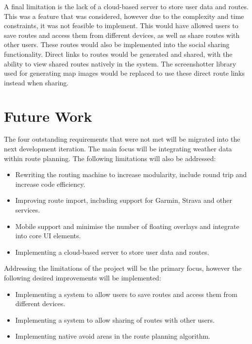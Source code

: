 A final limitation is the lack of a cloud-based server to store user data and routes. This was a feature that was considered, however due to the complexity and time constraints, it was not feasible to implement. This would have allowed users to save routes and access them from different devices, as well as share routes with other users. These routes would also be implemented into the social sharing functionality. Direct links to routes would be generated and shared, with the ability to view shared routes natively in the system. The screenshotter library used for generating map images would be replaced to use these direct route links instead when sharing.

\section{Future Work}
\label{evaluation:future}

The four outstanding requirements that were not met will be migrated into the next development iteration. The main focus will be integrating weather data within route planning. The following limitations will also be addressed:
\begin{itemize}
    \item Rewriting the routing machine to increase modularity, include round trip and increase code efficiency.
    \item Improving route import, including support for Garmin, Strava and other services.
    \item Mobile support and minimise the number of floating overlays and integrate into core UI elements.
    \item Implementing a cloud-based server to store user data and routes.
\end{itemize}
Addressing the limitations of the project will be the primary focus, however the following desired improvements will be implemented:
\begin{itemize}
    \item Implementing a system to allow users to save routes and access them from different devices.
    \item Implementing a system to allow sharing of routes with other users.
    \item Implementing native avoid areas in the route planning algorithm.
\end{itemize}